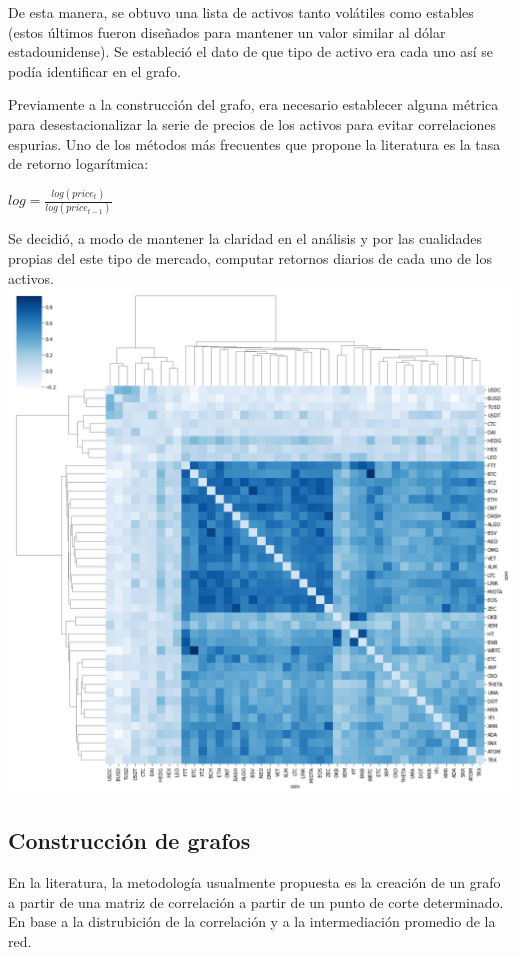 \documentclass[runningheads,a4paper,10pt]{etc/llncs}
\begin{document}
De esta manera, se obtuvo una lista de activos tanto volátiles como estables (estos últimos fueron diseñados para mantener un valor similar al dólar estadounidense). Se estableció el dato de que tipo de activo era cada uno así se podía identificar en el grafo.

Previamente a la construcción del grafo, era necesario establecer alguna métrica para desestacionalizar la serie de precios de los activos para evitar correlaciones espurias. Uno de los métodos más frecuentes que propone la literatura es la tasa de retorno logarítmica: 


$log=\frac{log(price_t)}{log(price_{t-1})}$


Se decidió, a modo de mantener la claridad en el análisis y por las cualidades propias del este tipo de mercado, computar retornos diarios de cada uno de los activos. 
\includegraphics[scale=.35]{images/corr_matrix.png}

\subsection{Construcción de grafos}

En la literatura, la metodología usualmente propuesta es la creación de un grafo a partir de una matriz de correlación a partir de un punto de corte determinado. En base a la distrubición de la correlación y a la intermediación promedio de la red.
\end{document}
